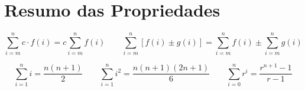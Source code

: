 \documentclass[12pt, a4paper]{article}
\begin{document}
\section{Resumo das Propriedades}

\[
\sum_{i=m}^{n} c \cdot f(i) = c \sum_{i=m}^{n} f(i)
\qquad
\sum_{i=m}^{n}[f(i)\pm g(i)] = \sum_{i=m}^{n}f(i) \pm \sum_{i=m}^{n}g(i)
\]

\[
\sum_{i=1}^{n} i = \frac{n(n+1)}{2}
\qquad
\sum_{i=1}^{n} i^2 = \frac{n(n+1)(2n+1)}{6}
\qquad
\sum_{i=0}^{n} r^i = \frac{r^{n+1}-1}{r-1}
\]
\end{document}
